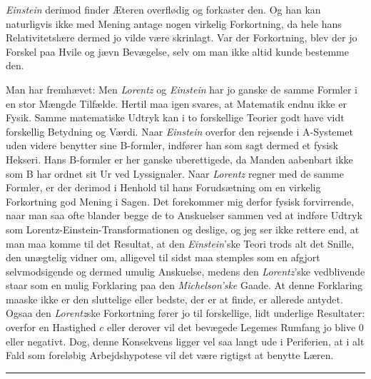 \documentclass[12pt,a4paper]{article}
\begin{document}
\emph{Einstein} derimod finder Æteren overflødig og forkaster den. Og han kan
naturligvis ikke med Mening antage nogen virkelig Forkortning, da hele hans
Relativitetslære dermed jo vilde være skrinlagt. Var der Forkortning, blev der
jo Forskel paa Hvile og jævn Bevægelse, selv om man ikke altid kunde bestemme
den.

Man har fremhævet: Men \emph{Lorentz} og \emph{Einstein} har jo ganske de samme
Formler i en stor Mængde Tilfælde. Hertil maa igen svares, at Matematik endnu
ikke er Fysik. Samme matematiske Udtryk kan i to forskellige Teorier godt have
vidt forskellig Betydning og Værdi. Naar \emph{Einstein} overfor den rejsende i
A-Systemet uden videre benytter sine B-formler, indfører han som sagt dermed et
fysisk Hekseri. Hans B-formler er her ganske uberettigede, da Manden aabenbart
ikke som B har ordnet sit Ur ved Lyssignaler. Naar \emph{Lorentz} regner med de
samme Formler, er der derimod i Henhold til hans Forudsætning om en virkelig
Forkortning god Mening i Sagen. Det forekommer mig derfor fysisk forvirrende,
naar man saa ofte blander begge de to Anskuelser sammen ved at indføre Udtryk
som \guillemotleft Lorentz-Einstein-Transformationen\guillemotright{} og
deslige, og jeg ser ikke rettere end, at man maa komme til det Resultat, at den
\emph{Einstein}'ske Teori trods alt det Snille, den unægtelig vidner om,
alligevel til sidst maa stemples som en afgjort selvmodsigende og dermed umulig
Anskuelse, medens den \emph{Lorentz}'ske vedblivende staar som en mulig
Forklaring paa den \emph{Michelson'ske} Gaade. At denne Forklaring maaske ikke
er den sluttelige eller bedste, der er at finde, er allerede antydet. Ogsaa den
\emph{Lorentz}ske Forkortning fører jo til forskellige, lidt underlige
Resultater: overfor en Hastighed $c$ eller derover vil det bevægede Legemes
Rumfang jo blive 0 eller negativt. Dog, denne Konsekvens ligger vel saa langt
ude i Periferien, at i alt Fald som foreløbig Arbejdshypotese vil det være
rigtigst at benytte Læren.

\begin{center}
\rule{0.16\textwidth}{0.5pt}
\end{center}
\end{document}
